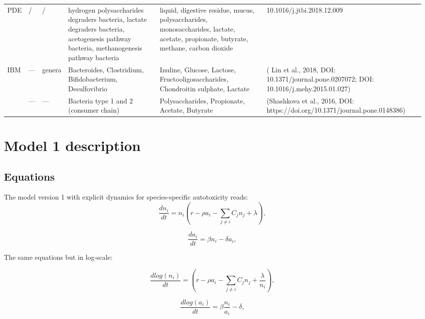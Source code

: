 \documentclass[11pt,a4paper,fleqn]{article}
\begin{document}
\begin{table}[ht]
{\begin{tabular}{L{2.2cm} L{3cm} L{4cm} L{4.2cm} L{3cm} L{3cm}}
\addlinespace
PDE & / & / &  hydrogen polysaccharides degraders bacteria, lactate degraders bacteria, acetogenesis pathway bacteria, methanogenesis pathway bacteria & liquid, digestive residue, mucus, polysaccharides, monosaccharides, lactate, acetate, propionate, butyrate, methane, carbon dioxide 
 & 10.1016/j.jtbi.2018.12.009 \\

\addlinespace
IBM & — & genera & Bacteroides, Clostridium, Bifidobacterium, Desulfovibrio & Inuline, Glucose, Lactose, Fructooligosaccharides, Chondroitin sulphate, Lactate
 & (\cite{lin2018gutlogo} Lin et al., 2018, DOI: 10.1371/journal.pone.0207072; DOI: 10.1016/j.mehy.2015.01.027) \\
& — & — & Bacteria type 1 and 2 (consumer chain) & Polysaccharides, Propionate, Acetate, Butyrate & (Shashkova et al., 2016, DOI: https://doi.org/10.1371/journal.pone.0148386) \\

\bottomrule
\end{tabular}
}
\end{table}




\clearpage
\section{Model 1 description}
\subsection{Equations}
The model version 1 with explicit dynamics for species-specific autotoxicity reads:
\begin{equation}
\frac{dn_i}{dt} = n_i \left(r - \rho a_i - \sum_{j \neq i} C_{j} n_j + \lambda \right), \label{eq:1}
\end{equation}

\begin{equation}
\frac{da_i}{dt} = \beta n_i - \delta a_i, \label{eq:2}
\end{equation}

The same equations but in log-scale:

\begin{equation}
\frac{dlog(n_i)}{dt} =  \left(r - \rho a_i - \sum_{j \neq i} C_{j} n_j + \frac{\lambda}{n_i} \right), \label{eq:3}
\end{equation}

\begin{equation}
\frac{dlog(a_i)}{dt} = \beta\frac{n_i}{a_i} - \delta , \label{eq:4}
\end{equation}
\end{document}
